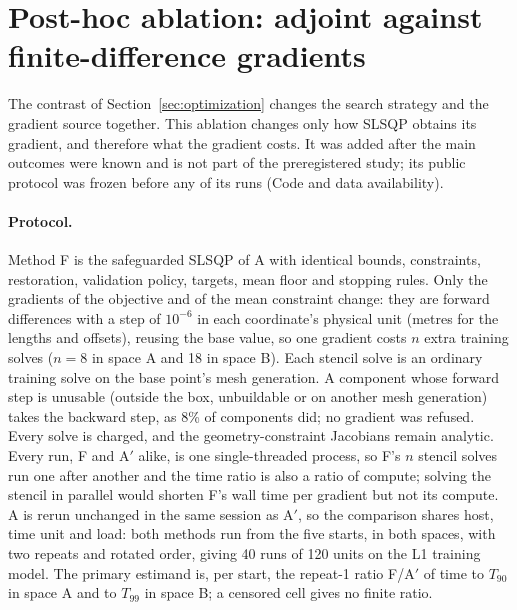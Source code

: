\section{Post-hoc ablation: adjoint against finite-difference gradients}\label{sec:exp2-fd}
The contrast of Section~\ref{sec:optimization} changes the search strategy
and the gradient source together. This ablation changes only how SLSQP
obtains its gradient, and therefore what the gradient costs. It was added
after the main outcomes were known and is not part of the preregistered
study; its public protocol was frozen before any of its runs (Code and data
availability).

\paragraph{Protocol.}
Method F is the safeguarded SLSQP of A with identical bounds, constraints,
restoration, validation policy, targets, mean floor and stopping rules.
Only the gradients of the objective and of the mean constraint change: they
are forward differences with a step of $10^{-6}$ in each coordinate's
physical unit (metres for the lengths and offsets), reusing the base value,
so one gradient costs $n$ extra training solves ($n=8$ in space A and 18 in
space B). Each stencil solve is an ordinary training solve on the base
point's mesh generation. A component whose forward step is unusable
(outside the box, unbuildable or on another mesh generation) takes the
backward step, as 8\% of components did; no gradient was refused. Every
solve is charged, and the geometry-constraint Jacobians remain analytic.
Every run, F and A$'$ alike, is one single-threaded process, so F's $n$
stencil solves run one after another and the time ratio is also a ratio of
compute; solving the stencil in parallel would shorten F's wall time per
gradient but not its compute. A is rerun unchanged in the same session as
A$'$, so the comparison shares host, time unit and load: both methods run
from the five starts, in both spaces, with two repeats and rotated order,
giving 40 runs of 120 units on the L1 training model. The primary estimand
is, per start, the repeat-1 ratio F/A$'$ of time to $T_{90}$ in space A and
to $T_{99}$ in space B; a censored cell gives no finite ratio.

